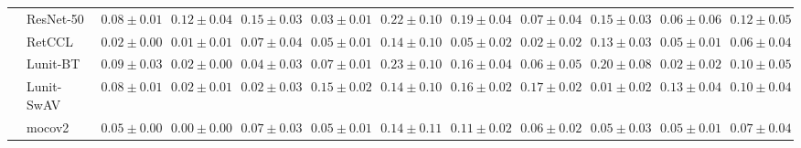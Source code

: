 \begin{tabular}{ll|cccc|c|cccc|c}
 & ResNet-50 & $0.08 \pm 0.01$ & $0.12 \pm 0.04$ & $0.15 \pm 0.03$ & $0.03 \pm 0.01$ & $0.22 \pm 0.10$ & $0.19 \pm 0.04$ & $0.07 \pm 0.04$ & $0.15 \pm 0.03$ & $0.06 \pm 0.06$ & $0.12 \pm 0.05$ \\
 & RetCCL & $0.02 \pm 0.00$ & $0.01 \pm 0.01$ & $0.07 \pm 0.04$ & $0.05 \pm 0.01$ & $0.14 \pm 0.10$ & $0.05 \pm 0.02$ & $0.02 \pm 0.02$ & $0.13 \pm 0.03$ & $0.05 \pm 0.01$ & $0.06 \pm 0.04$ \\
 & Lunit-BT & $0.09 \pm 0.03$ & $0.02 \pm 0.00$ & $0.04 \pm 0.03$ & $0.07 \pm 0.01$ & $0.23 \pm 0.10$ & $0.16 \pm 0.04$ & $0.06 \pm 0.05$ & $0.20 \pm 0.08$ & $0.02 \pm 0.02$ & $0.10 \pm 0.05$ \\
 & Lunit-SwAV & $0.08 \pm 0.01$ & $0.02 \pm 0.01$ & $\mathbf{0.02 \pm 0.03}$ & $0.15 \pm 0.02$ & $0.14 \pm 0.10$ & $0.16 \pm 0.02$ & $0.17 \pm 0.02$ & $\mathbf{0.01 \pm 0.02}$ & $0.13 \pm 0.04$ & $0.10 \pm 0.04$ \\
 & mocov2 & $0.05 \pm 0.00$ & $\mathbf{0.00 \pm 0.00}$ & $0.07 \pm 0.03$ & $0.05 \pm 0.01$ & $0.14 \pm 0.11$ & $0.11 \pm 0.02$ & $0.06 \pm 0.02$ & $0.05 \pm 0.03$ & $0.05 \pm 0.01$ & $0.07 \pm 0.04$ \\
\cline{1-12}
\bottomrule
\end{tabular}
